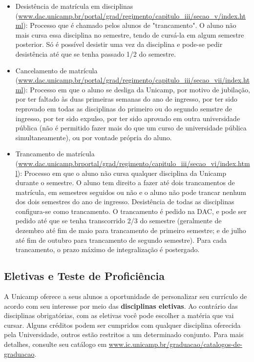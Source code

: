 \begin{itemize}
\item Desistência de matrícula em disciplinas
      (\url{www.dac.unicamp.br/portal/grad/regimento/capitulo_iii/secao_v/index.html}):
      Processo que é chamado pelos alunos de "trancamento".
      O aluno não mais cursa essa disciplina no semestre,
      tendo de cursá-la em algum semestre posterior. Só é possível desistir uma vez da
      disciplina e pode-se pedir desistência até que se tenha passado 1/2 do
      semestre.
\item Cancelamento de matrícula
      (\url{www.dac.unicamp.br/portal/grad/regimento/capitulo_iii/secao_vii/index.html}):
      Processo em que o aluno se desliga da Unicamp, por motivo de jubilação, por
      ter faltado às duas primeiras semanas do ano de ingresso, por ter sido
      reprovado em todas as disciplinas do primeiro ou do segundo semstre de
      ingresso, por ter sido expulso, por ter sido aprovado em outra universidade
      pública (não é permitido fazer mais do que um curso de universidade pública
      simultaneamente), ou por vontade própria do aluno.
\item Trancamento de matrícula
      (\url{www.dac.unicamp.brportal/grad/regimento/capitulo_iii/secao_vi/index.html}):
      Processo em que o aluno não cursa qualquer disciplina da Unicamp durante
      o semestre. O aluno tem direito a fazer até dois trancamentos de matrícula, em
      semestres seguidos ou não e o aluno não pode trancar nenhum dos dois
      semestres do ano de ingresso. Desistência de todas as disciplinas
      configura-se como trancamento. O trancamento é pedido na DAC, e pode ser
      pedido até que se tenha transcorrido 2/3 do semestre (geralmente de dezembro
      até fim de maio para trancamento de primeiro semestre; e de julho até fim de
      outubro para trancamento de segundo semestre). Para cada trancamento,
      o prazo máximo de integralização é postergado.
\end{itemize}

\subsection{Eletivas e Teste de Proficiência}

A Unicamp oferece a seus alunos a oportunidade de personalizar seu currículo de
acordo com seu interesse por meio das \textbf{disciplinas eletivas}. Ao contrário das
disciplinas obrigatórias, com as eletivas você pode escolher a matéria que vai cursar. Alguns
créditos podem ser cumpridos com qualquer disciplina oferecida pela
Universidade, outros estão restritos a um determinado conjunto. Para mais
detalhes, consulte seu catálogo em
\url{www.ic.unicamp.br/graduacao/catalogos-de-graduacao}.

